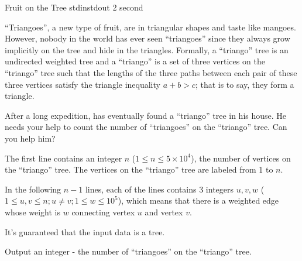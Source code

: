 
\begin{problem}{Fruit on the Tree}
{stdin}{stdout}
{2 second}{}{}

``Triangoes'', a new type of fruit, are in triangular shapes and taste like mangoes. However, nobody in the world has ever seen ``triangoes'' since they always grow implicitly on the tree and hide in the triangles. Formally, a ``triango'' tree is an undirected weighted tree and a ``triango'' is a set of three vertices on the ``triango'' tree such that the lengths of the three paths between each pair of these three vertices satisfy the triangle inequality $a + b > c$; that is to say, they form a triangle. 

After a long expedition, \Suzukaze has eventually found a ``triango'' tree in his house. He needs your help to count the number of ``triangoes'' on the ``triango'' tree. Can you help him? 

\InputFile

The first line contains an integer $n$ ($1 \le n \le 5 \times 10^4$), the number of vertices on the ``triango'' tree. The vertices on the ``triango'' tree are labeled from 1 to $n$.

In the following $n-1$ lines, each of the lines contains 3 integers $u, v, w$ ($1 \le u,v \le n; u \neq v;1 \le w \le 10^5$), which means that there is a weighted edge whose weight is $w$ connecting vertex $u$ and vertex $v$. 

It's guaranteed that the input data is a tree.

\OutputFile

Output an integer - the number of ``triangoes'' on the ``triango'' tree. 

\Examples

\begin{example}
%
\end{example}

\end{problem}